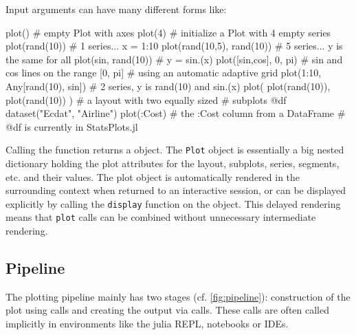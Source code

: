 \documentclass[a4paper]{article}
\begin{document}
Input arguments can have many different forms like:
%
\begin{code}
plot()                                       # empty Plot with axes
plot(4)                                      # initialize a Plot with 4 empty series
plot(rand(10))                               # 1 series... x = 1:10
plot(rand(10,5), rand(10))                   # 5 series... y is the same for all
plot(sin, rand(10))                          # y = sin.(x)
plot([sin,cos], 0, pi)                       # sin and cos lines on the range [0, pi]
                                             # using an automatic adaptive grid
plot(1:10, Any[rand(10), sin])               # 2 series, y is rand(10) and sin.(x)
plot( plot(rand(10)), plot(rand(10)) )       # a layout with two equally sized
                                             # subplots
@df dataset("Ecdat", "Airline") plot(:Cost)  # the :Cost column from a DataFrame
                                             # @df is currently in StatsPlots.jl
\end{code}
%
Calling the  function returns a  object.
The \texttt{Plot} object is essentially a big nested dictionary holding the plot attributes for the layout, subplots, series, segments, etc. and their values.
The plot object is automatically rendered in the surrounding context when returned to an interactive session, or can be displayed explicitly by calling the \texttt{display} function on the object.
This delayed rendering means that \texttt{plot} calls can be combined without unnecessary intermediate rendering.

\subsection*{Pipeline}

The plotting pipeline mainly has two stages (cf. \cref{fig:pipeline}): construction of the plot using  calls and creating the output via  calls.
These calls are often called implicitly in environments like the julia REPL, notebooks or IDEs.
\end{document}

